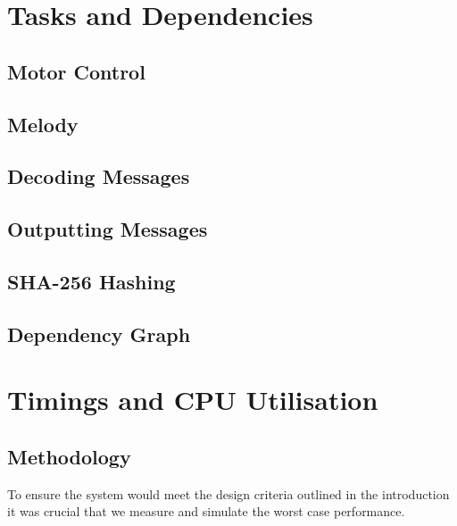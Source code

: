 \documentclass{article}
\begin{document}
\section{Tasks and Dependencies}
\subsection{Motor Control}

\subsection{Melody}

\subsection{Decoding Messages}

\subsection{Outputting Messages}

\subsection{SHA-256 Hashing}

\subsection{Dependency Graph}



\section{Timings and CPU Utilisation}
\subsection{Methodology}
To ensure the system would meet the design criteria outlined in the introduction it was crucial that we measure and simulate the worst case performance. 
\end{document}
